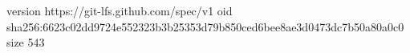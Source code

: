 version https://git-lfs.github.com/spec/v1
oid sha256:6623c02dd9724e552323b3b25353d79b850ced6bee8ae3d0473dc7b50a80a0c0
size 543
